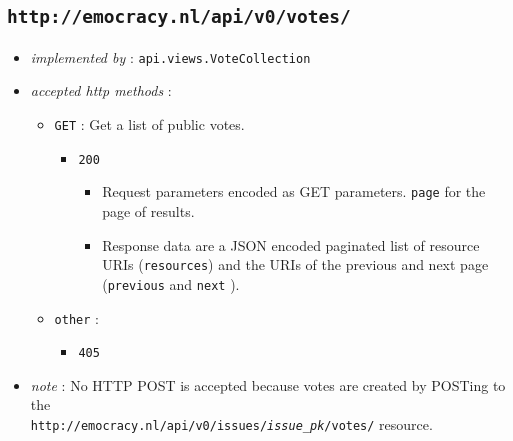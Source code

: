 \documentclass[a4paper]{report}
\begin{document}
\subsection{\texttt{http://emocracy.nl/api/v0/votes/}}
\begin{itemize}
    \item{\textsl{implemented by} : \texttt{api.views.VoteCollection}}
    \item{\textsl{accepted http methods} :
        \begin{itemize}
            \item{\texttt{GET} : Get a list of public votes.
                \begin{itemize}
                    \item{\texttt{200} 
                    \begin{itemize}
                        \item{Request parameters encoded as GET parameters. 
                        \texttt{page} for the page of results.}
                        \item{Response data are a JSON encoded paginated list of 
                        resource URIs (\texttt{resources}) and the URIs of the 
                        previous and next page (\texttt{previous} and \texttt{next}
                        ).}
                    \end{itemize}
                    }
                \end{itemize}
            }
            \item{\texttt{other} :
                \begin{itemize}
                    \item{\texttt{405}}
                \end{itemize}
            }
        \end{itemize}
    }
    \item{\textsl{note} : No HTTP POST is accepted because votes are created
    by POSTing to the\\
    \mbox{\texttt{http://emocracy.nl/api/v0/issues/\emph{issue\_pk}/votes/}}
    resource.
    }
\end{itemize}
\end{document}
